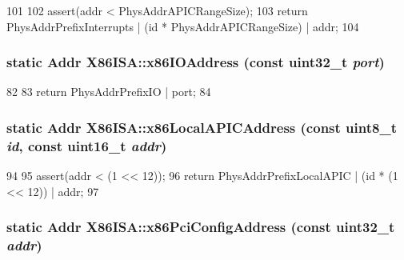 \begin{DoxyCode}
101     {
102         assert(addr < PhysAddrAPICRangeSize);
103         return PhysAddrPrefixInterrupts | (id * PhysAddrAPICRangeSize) | addr;
104     }
\end{DoxyCode}
\hypertarget{namespaceX86ISA_afaa9240a3523dc80cfb1ecfba872f27e}{
\subsubsection[{x86IOAddress}]{\setlength{\rightskip}{0pt plus 5cm}static {\bf Addr} X86ISA::x86IOAddress (const {\bf uint32\_\-t} {\em port})}}
\label{namespaceX86ISA_afaa9240a3523dc80cfb1ecfba872f27e}



\begin{DoxyCode}
82     {
83         return PhysAddrPrefixIO | port;
84     }
\end{DoxyCode}
\hypertarget{namespaceX86ISA_afe1cfa1e015d1bc9a1aaa13453e9af92}{
\subsubsection[{x86LocalAPICAddress}]{\setlength{\rightskip}{0pt plus 5cm}static {\bf Addr} X86ISA::x86LocalAPICAddress (const uint8\_\-t {\em id}, \/  const uint16\_\-t {\em addr})}}
\label{namespaceX86ISA_afe1cfa1e015d1bc9a1aaa13453e9af92}



\begin{DoxyCode}
94     {
95         assert(addr < (1 << 12));
96         return PhysAddrPrefixLocalAPIC | (id * (1 << 12)) | addr;
97     }
\end{DoxyCode}
\hypertarget{namespaceX86ISA_a5b68d0901ef27939565621f528be9b94}{
\subsubsection[{x86PciConfigAddress}]{\setlength{\rightskip}{0pt plus 5cm}static {\bf Addr} X86ISA::x86PciConfigAddress (const {\bf uint32\_\-t} {\em addr})}}
\label{namespaceX86ISA_a5b68d0901ef27939565621f528be9b94}



